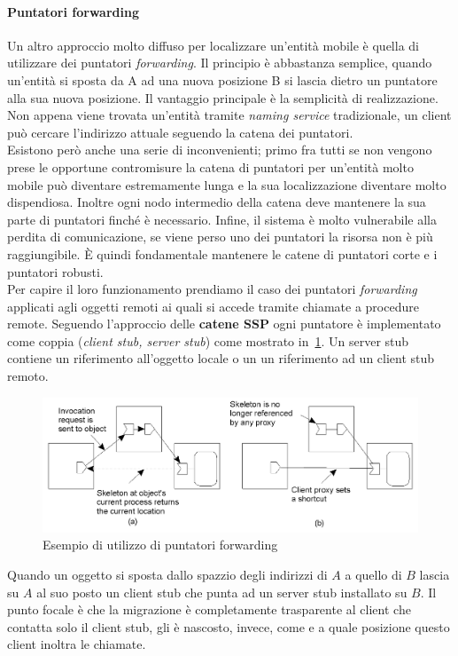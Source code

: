 \paragraph{Puntatori forwarding}
Un altro approccio molto diffuso per localizzare un'entità mobile è quella di utilizzare dei puntatori \emph{forwarding}. Il principio è abbastanza semplice, quando un'entità si sposta da A ad una nuova posizione B si lascia dietro un puntatore alla sua nuova posizione. Il vantaggio principale è la semplicità di realizzazione. Non appena viene trovata un'entità tramite \emph{naming service} tradizionale, un client può cercare l'indirizzo attuale seguendo la catena dei puntatori.\\
Esistono però anche una serie di inconvenienti; primo fra tutti se non vengono prese le opportune contromisure la catena di puntatori per un'entità molto mobile può diventare estremamente lunga e la sua localizzazione diventare molto dispendiosa. Inoltre ogni nodo intermedio della catena deve mantenere la sua parte di puntatori finché è necessario. Infine, il sistema è molto vulnerabile alla perdita di comunicazione, se viene perso uno dei puntatori la risorsa non è più raggiungibile. \uppercase{è} quindi fondamentale mantenere le catene di puntatori corte e i puntatori robusti.\\
Per capire il loro funzionamento prendiamo il caso dei puntatori \emph{forwarding} applicati agli oggetti remoti ai quali si accede tramite chiamate a procedure remote. Seguendo l'approccio delle \textbf{catene SSP} ogni puntatore è implementato come coppia (\emph{client stub, server stub}) come mostrato in \figurename\,\ref{img:forwarding}. Un server stub contiene un riferimento all'oggetto locale o un un riferimento ad un client stub remoto.\\
\begin{figure}
\centering
\includegraphics[scale=0.5]{img/forwarding.png}
\caption{Esempio di utilizzo di puntatori forwarding}\label{img:forwarding}
\end{figure}
Quando un oggetto si sposta dallo spazzio degli indirizzi di $A$ a quello di $B$ lascia su $A$ al suo posto un client stub che punta ad un server stub installato su $B$. Il punto focale è che la migrazione è completamente trasparente al client che contatta solo il client stub, gli è nascosto, invece, come e a quale posizione questo client inoltra le chiamate.\\
